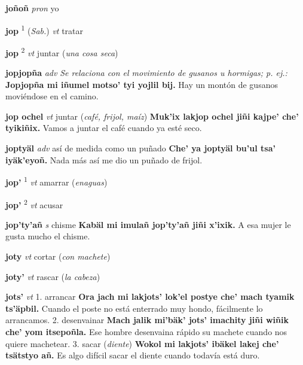 \documentclass[10pt]{scrbook}
\newcommand{\entry}[1]{\textbf{#1}}
\newcommand{\onedefinition}[1]{#1.}
\newcommand{\defsuperscript}[1]{\textsuperscript{#1}}
\newcommand{\nontranslationdef}[1]{\textit{#1}}
\newcommand{\partofspeech}[1]{\textit{#1}}
\newcommand{\spanishtranslation}[1]{#1}
\newcommand{\clarification}[1]{(\textit{#1})}
\newcommand{\cholexample}[1]{\textbf{#1}}
\newcommand{\exampletranslation}[1]{#1}
\newcommand{\relevantdialect}[1]{(\textit{#1})}
\begin{document}
\begin{multicols}{2}
\entry{joñoñ}
\partofspeech{pron}
\spanishtranslation{yo}

\entry{jop}
\defsuperscript{1}
\relevantdialect{Sab.}
\partofspeech{vt}
\spanishtranslation{tratar}

\entry{jop}
\defsuperscript{2}
\partofspeech{vt}
\spanishtranslation{juntar}
\clarification{una cosa seca}

\entry{jopjopña}
\partofspeech{adv}
\nontranslationdef{Se relaciona con el movimiento de gusanos u hormigas; p. ej.:}
\cholexample{Jopjopña mi iñumel motso' tyi yojlil bij.}
\exampletranslation{Hay un montón de gusanos moviéndose en el camino.}

\entry{jop ochel}
\partofspeech{vt}
\spanishtranslation{juntar}
\clarification{café, frijol, maíz}
\cholexample{Muk'ix lakjop ochel jiñi kajpe' che' tyikiñix.}
\exampletranslation{Vamos a juntar el café cuando ya esté seco.}

\entry{joptyäl}
\partofspeech{adv}
\spanishtranslation{así de medida como un puñado}
\cholexample{Che' ya joptyäl bu'ul tsa' iyäk'eyoñ.}
\exampletranslation{Nada más así me dio un puñado de frijol.}

\entry{jop'}
\defsuperscript{1}
\partofspeech{vt}
\spanishtranslation{amarrar}
\clarification{enaguas}

\entry{jop'}
\defsuperscript{2}
\partofspeech{vt}
\spanishtranslation{acusar}

\entry{jop'ty'añ}
\partofspeech{s}
\spanishtranslation{chisme}
\cholexample{Kabäl mi imulañ jop'ty'añ jiñi x'ixik.}
\exampletranslation{A esa mujer le gusta mucho el chisme.}

\entry{joty}
\partofspeech{vt}
\spanishtranslation{cortar}
\clarification{con machete}

\entry{joty'}
\partofspeech{vt}
\spanishtranslation{rascar}
\clarification{la cabeza}

\entry{jots'}
\partofspeech{vt}
\onedefinition{1}
\spanishtranslation{arrancar}
\cholexample{Ora jach mi lakjots' lok'el postye che' mach tyamik ts'äpbil.}
\exampletranslation{Cuando el poste no está enterrado muy hondo, fácilmente lo arrancamos.}
\onedefinition{2}
\spanishtranslation{desenvainar}
\cholexample{Mach jalik mi'bäk' jots' imachity jiñi wiñik che' yom itsepoñla.}
\exampletranslation{Ese hombre desenvaina rápido su machete cuando nos quiere machetear.}
\onedefinition{3}
\spanishtranslation{sacar}
\clarification{diente}
\cholexample{Wokol mi lakjots' ibäkel lakej che' tsätstyo añ.}
\exampletranslation{Es algo difícil sacar el diente cuando todavía está duro.}


\end{multicols}
\end{document}
